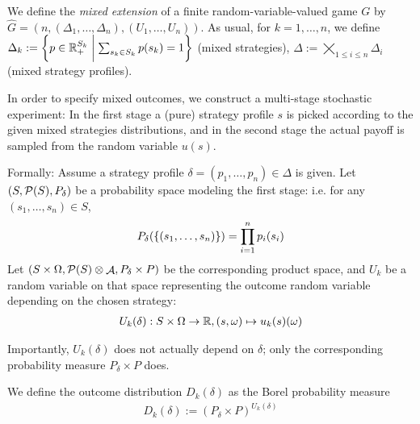 \documentclass[a4paper]{scrreprt}
\DeclareMathOperator{\A}{\mathcal{A}}
\newcommand{\Rp}{\mathbb{R}_+}
\begin{document}
    \begin{defn}
        We define the \emph{mixed extension} of a finite random-variable-valued game $G$ by $\hat{G} = (n, (\Delta_1, \dots, \Delta_n), (U_1, \dots, U_n))$. As usual, for $k = 1,\dots,n$, we define $\Delta_k := \biggset{ p \in \Rp^{S_k} \biggmid \sum_{s_k \in S_k} p(s_k) = 1 } $ (mixed strategies), $\Delta := \bigtimes\limits_{1\leq i \leq n} \Delta_i$ (mixed strategy profiles).
        
        In order to specify mixed outcomes, we construct a multi-stage stochastic experiment:
        In the first stage a (pure) strategy profile $s$ is picked according to the given mixed strategies distributions,
        and in the second stage the actual payoff is sampled from the random variable $u(s)$.
        
        Formally: Assume a strategy profile $\delta = (p_1, \dots, p_n) \in \Delta$ is given.
        Let $(S, \operatorname{\mathcal{P}}(S), P_\delta)$ be a probability space modeling the first stage: i.e. for any $(s_1, \dots, s_n) \in S$,
        \begin{gather}
            P_\delta(\{(s_1, \dots, s_n)\}) = \prod_{i=1}^n p_i(s_i)
        \end{gather}
        Let $(S\times\Omega, \Pot(S)\otimes \A, P_\delta \times P)$ be the corresponding product space, and $U_k$ be a random variable on that space representing the outcome random variable depending on the chosen strategy:
        \begin{gather}
            U_k(\delta): S \times \Omega \to \mathbb{R}, (s, \omega) \mapsto u_k(s)(\omega)
        \end{gather}
        
        Importantly, $U_k(\delta)$ does not actually depend on $\delta$; only the corresponding probability measure $P_\delta \times P$ does.
        
        We define the outcome distribution $D_k(\delta)$ as the Borel probability measure 
        \begin{gather*}
            D_k(\delta) := (P_\delta \times P)^{U_k(\delta)}
        \end{gather*}
    \end{defn}
\end{document}
